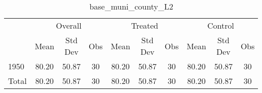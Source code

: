 \begin{table}[htbp]\centering
\def\sym#1{\ifmmode^{#1}\else\(^{#1}\)\fi}
\caption{base\_muni\_county\_L2 \label{tab1}}
\begin{tabular}{l*{3}{ccc}}
\toprule
                    &\multicolumn{3}{c}{Overall}           &\multicolumn{3}{c}{Treated}           &\multicolumn{3}{c}{Control}           \\
                    &        Mean&     Std Dev&         Obs&        Mean&     Std Dev&         Obs&        Mean&     Std Dev&         Obs\\
\midrule
1950                &       80.20&       50.87&          30&       80.20&       50.87&          30&       80.20&       50.87&          30\\
Total               &       80.20&       50.87&          30&       80.20&       50.87&          30&       80.20&       50.87&          30\\
\bottomrule
\end{tabular}
\end{table}
